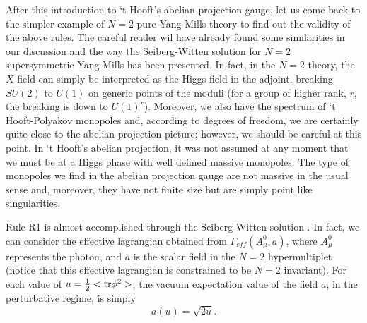 After this introduction to `t Hooft's abelian projection gauge,
let us come back to the simpler example of $N\!=\!2$ pure
Yang-Mills theory to find out the validity of the above rules.
The careful reader wil have already found some similarities in
our discussion and the way the Seiberg-Witten solution for
$N\!=\!2$ supersymmetric Yang-Mills has been presented. In fact,
in the $N\!=\!2$ theory, the $X$ field can simply be interpreted
as the Higgs field in the adjoint, breaking $SU(2)$ to $U(1)$ on
generic points of the moduli (for a group of higher rank, $r$,
the breaking is down to $U(1)^r$). Moreover, we also have the
spectrum of `t Hooft-Polyakov monopoles and, according to degrees
of freedom, we are certainly quite close to the abelian
projection picture; however, we should be careful at this point.
In `t Hooft's abelian projection, it was not assumed at any
moment that we must be at a Higgs phase with well defined massive
monopoles. The type of monopoles we find in the abelian
projection gauge are not massive in the usual sense and,
moreover, they have not finite size but are simply point like
singularities.
  
Rule R1 is almost accomplished through the Seiberg-Witten
solution \cite{SW,SW2}. In fact, we can consider the effective lagrangian
obtained from $\Gamma_{eff}(A_{\mu}^0,a)$, where $A_{\mu}^0$
represents the photon, and $a$ is the scalar field in the
$N\!=\!2$ hypermultiplet (notice that this effective lagrangian
is constrained to be $N\!=\!2$ invariant). For each value of
$u=\frac {1}{2} <\hbox{tr} \phi^2>$, the vacuum expectation value
of the field $a$, in the perturbative regime, is simply
\begin{equation}
a(u) = \sqrt{2u}.
\label{eq:II82}
\end{equation}
  
